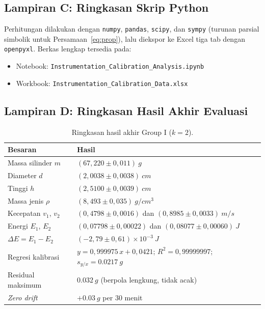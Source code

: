 \documentclass[a4paper, 12pt]{article}
\begin{document}
    \subsection*{Lampiran C: Ringkasan Skrip Python}
    \noindent Perhitungan dilakukan dengan \texttt{numpy}, \texttt{pandas}, \texttt{scipy}, dan \texttt{sympy} (turunan parsial simbolik untuk Persamaan~\eqref{eq:prop}), lalu diekspor ke Excel tiga tab dengan \texttt{openpyxl}. Berkas lengkap tersedia pada:
    \begin{itemize}
        \item Notebook: \texttt{Instrumentation\_Calibration\_Analysis.ipynb}
        \item Workbook: \texttt{Instrumentation\_Calibration\_Data.xlsx}
    \end{itemize}

    \subsection*{Lampiran D: Ringkasan Hasil Akhir Evaluasi}
    \begin{table}[H]
    \centering
    \singlespacing
    \caption{Ringkasan hasil akhir Group I ($k=2$).}
    \label{tab:ringkas}
    \small
    \begin{tabularx}{\textwidth}{@{}l X@{}}
    \toprule
    \textbf{Besaran} & \textbf{Hasil}\\
    \midrule
    Massa silinder $m$ & $(67{,}220\pm0{,}011)\ \si{g}$\\
    Diameter $d$ & $(2{,}0038\pm0{,}0038)\ \si{cm}$\\
    Tinggi $h$ & $(2{,}5100\pm0{,}0039)\ \si{cm}$\\
    Massa jenis $\rho$ & $(8{,}493\pm0{,}035)\ \si{g/cm^3}$\\
    Kecepatan $v_1$, $v_2$ & $(0{,}4798\pm0{,}0016)$ dan $(0{,}8985\pm0{,}0033)\ \si{m/s}$\\
    Energi $E_1$, $E_2$ & $(0{,}07798\pm0{,}00022)$ dan $(0{,}08077\pm0{,}00060)\ \si{J}$\\
    $\Delta E=E_1-E_2$ & $(-2{,}79\pm0{,}61)\times10^{-3}\ \si{J}$\\
    Regresi kalibrasi & $y=0{,}999975\,x+0{,}0421$; $R^2=0{,}99999997$; $s_{y/x}=\SI{0,0217}{g}$\\
    Residual maksimum & $\SI{0,032}{g}$ (berpola lengkung, tidak acak)\\
    \textit{Zero drift} & $+\SI{0,03}{g}$ per $30$ menit\\
    \bottomrule
    \end{tabularx}
    \end{table}
\end{document}
